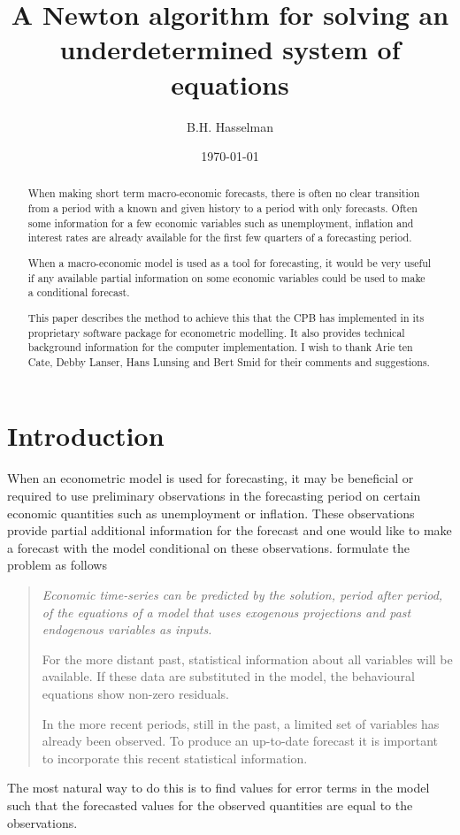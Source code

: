 \documentclass[english,memorandum,old,sectionpage]{cpbart}
\begin{document}
\author{B.H. Hasselman}
\title{A Newton algorithm for solving an underdetermined system of equations}
\date{\today}
\begin{abstract}
When making short term macro-economic forecasts, there is often
no clear transition from a period with a known and given history
to a period with only forecasts.
Often some information for a few economic variables such as
unemployment, inflation and interest rates are already available for the first
few quarters of a forecasting period.

When a macro-economic model is used as a tool for forecasting, it would be very
useful if any available partial  information on some economic variables
could be used to make a conditional forecast.

This paper describes the method to achieve this that the CPB has implemented
in its proprietary software package for econometric modelling.
It also provides technical background information for the computer implementation.
\Bpar
I wish to thank Arie ten Cate, Debby Lanser, Hans Lunsing and Bert Smid for their
comments and suggestions.
\end{abstract}
%
\maketitle
%
\tableofcontents

\section{Introduction}
When an econometric model is used for forecasting, it may be beneficial or
required to use preliminary observations in the forecasting period
on certain economic quantities
such as unemployment or inflation. These observations provide partial
additional information for the forecast and one would like to make a forecast with
the model conditional on these observations.
\cite*{sdbfit} formulate the problem as follows

\begin{quotation}\itshape
Economic time-series can be predicted by the solution, period after period, of
the equations of a model that uses exogenous projections and past endogenous
variables as inputs.

For the more distant past, statistical information about all variables will be
available. If these data are substituted in the model, the behavioural equations
show non-zero residuals.

In the more recent periods, still in the past, a limited set of variables has
already been observed. To produce an up-to-date forecast it is important to
incorporate this recent statistical information.
\end{quotation}
%
%
The most natural way to do this is to find values for error terms in the
model such that the forecasted values for the observed
quantities are equal to the observations.
\end{document}
